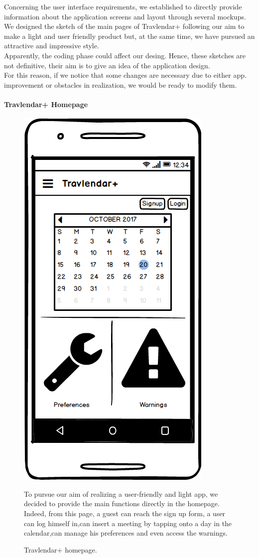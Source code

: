 
	\begin{flushleft}
		Concerning the user interface requirements, we established to directly provide information about the application screens and layout through several mockups. \\
		We designed the sketch of the main pages of Travlendar+ following our aim to make a light and user friendly product but, at the same time, we have pursued an attractive and impressive style. \\
		Apparently, the coding phase could affect our desing. Hence, these sketches are not definitive, their aim is to give an idea of the application design. \\
		For this reason, if we notice that some changes are necessary due to either app. improvement or obstacles in realization, we would be ready to modify them. 
	\end{flushleft}
\clearpage
\paragraph{Travlendar+ Homepage}
	\begin{figure}
		\centering
		\includegraphics[width=0.6\linewidth]{mockups/Homepage}
		\caption{Travlendar+ homepage.  
		}
	\label{fig:homepage}
	\begin{center}
		To pursue our aim of realizing a user-friendly and light app, we decided to provide the main functions directly in the homepage. Indeed, from this page, a guest can reach the sign up form, a user can log himself in,can insert a meeting by tapping onto a day in the calendar,can manage his preferences and even access the warnings. \\ 
	\end{center}
	\end{figure}

